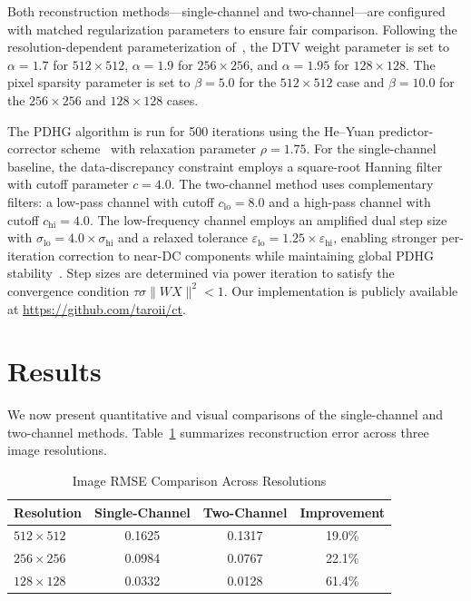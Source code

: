 \documentclass[journal, a4paper]{IEEEtran}
\begin{document}
Both reconstruction methods---single-channel and two-channel---are configured with matched regularization parameters to ensure fair comparison. Following the resolution-dependent parameterization of~\cite{sidky2025accurate}, the DTV weight parameter is set to $\alpha = 1.7$ for $512 \times 512$, $\alpha = 1.9$ for $256 \times 256$, and $\alpha = 1.95$ for $128 \times 128$. The pixel sparsity parameter is set to $\beta = 5.0$ for the $512 \times 512$ case and $\beta = 10.0$ for the $256 \times 256$ and $128 \times 128$ cases.

The PDHG algorithm is run for 500 iterations using the He--Yuan predictor-corrector scheme~\cite{he2012convergence} with relaxation parameter $\rho = 1.75$. For the single-channel baseline, the data-discrepancy constraint employs a square-root Hanning filter with cutoff parameter $c = 4.0$. The two-channel method uses complementary filters: a low-pass channel with cutoff $c_{\mathrm{lo}} = 8.0$ and a high-pass channel with cutoff $c_{\mathrm{hi}} = 4.0$. The low-frequency channel employs an amplified dual step size with $\sigma_{\mathrm{lo}} = 4.0 \times \sigma_{\mathrm{hi}}$ and a relaxed tolerance $\varepsilon_{\mathrm{lo}} = 1.25 \times \varepsilon_{\mathrm{hi}}$, enabling stronger per-iteration correction to near-DC components while maintaining global PDHG stability~\cite{chambolle2011first}. Step sizes are determined via power iteration to satisfy the convergence condition $\tau \sigma \|WX\|^2 < 1$. Our implementation is publicly available at \url{https://github.com/taroii/ct}.

\section{Results}

We now present quantitative and visual comparisons of the single-channel and two-channel methods. Table~\ref{tab:rmse} summarizes reconstruction error across three image resolutions.

\begin{table}[h]
\renewcommand{\arraystretch}{1.3}
\caption{Image RMSE Comparison Across Resolutions}
\label{tab:rmse}
\centering
\begin{tabular}{lccc}
\toprule
Resolution & Single-Channel & Two-Channel & Improvement \\
\midrule
$512 \times 512$ & 0.1625 & 0.1317 & 19.0\% \\
$256 \times 256$ & 0.0984 & 0.0767 & 22.1\% \\
$128 \times 128$ & 0.0332 & 0.0128 & 61.4\% \\
\bottomrule
\end{tabular}
\end{table}
\end{document}
